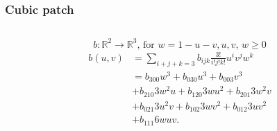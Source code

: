 \begin{frame}\frametitle{Cubic patch}
	\begin{columns}
		\begin{column}{\textwidth}
			\begin{equation*}
				b: \mathbb{R}^2 \rightarrow \mathbb{R}^3 \text{, for } w = 1 - u - v, u, v \text{, } w \geq 0
			\end{equation*}
			\begin{equation*}
				\begin{aligned}
					b(u,v) & = \sum\limits_{i+j+k=3} b_{ijk} \frac{3!}{i!j!k!} u^i v^j w^k\\
					& = b_{300} w^3 + b_{030} u^3 + b_{003} v^3 \\
					& + b_{210} 3 w^2 u + b_{120} 3 w u^2 + b_{201} 3 w^2 v\\
					& + b_{021} 3 u^2 v + b_{102} 3 w v^2 + b_{012} 3 u v^2\\
					& + b_{111} 6 w u v.
					\end{aligned}
			\end{equation*}
		\end{column}
	\end{columns}
\end{frame}